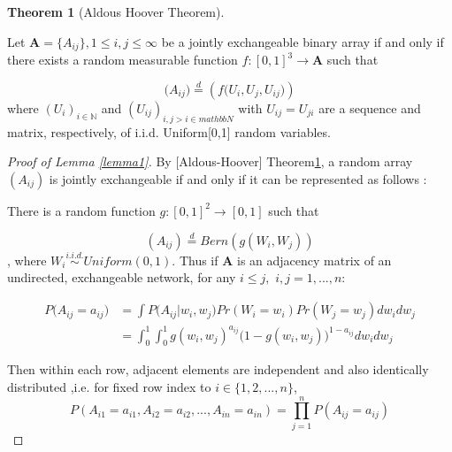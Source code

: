 \documentclass[12pt]{article}
\theoremstyle{definition}
\newtheorem{theorem}{Theorem}[section]
\begin{document}
\begin{theorem}[Aldous Hoover Theorem]
	\label{Aldous_Hoover}

Let $\mathbf{A} = \{A_{ij}\}, 1 \leq i,j \leq \infty$ be a jointly exchangeable binary array if and only if there exists a random measurable function $f : [0,1]^{3} \rightarrow \mathbf{A}$ such that 

\begin{equation}
\big(  A_{ij}  \big) \stackrel{d}{=} \left( f \big( U_{i}, U_{j}, U_{ij} \big)  \right)
\end{equation}
where $(U_{i})_{i \in \mathbb{N}}$ and $(U_{ij})_{i,j > i \in mathbb{N}}$ with $U_{ij} = U_{ji}$ are a sequence and matrix, respectively, of i.i.d. Uniform[0,1] random variables. 
\end{theorem}



\begin{proof}[Proof of Lemma \ref{lemma1}]
By [Aldous-Hoover] Theorem\ref{Aldous_Hoover}, a random array $(A_{ij})$ is jointly exchangeable if and only if it can be represented as follows : 

There is a random function $g : [0,1]^2 \rightarrow [0,1]$ such that 

$$(A_{ij})  \stackrel{d}{=} Bern( g(W_{i}, W_{j}))$$
, where $W_{i} \overset{i.i.d.}{\sim} Uniform(0,1)$. Thus if $\mathbf{A}$ is an adjacency matrix of an undirected, exchangeable network, for any $i \leq j,$ $i,j = 1,... , n$:


\begin{equation}
\begin{split}
P \big(  A_{ij} = a_{ij} \big) & = \int P \big( A_{ij} \big| w_{i}, w_{j} \big) Pr(W_{i} = w_{i}) Pr(W_{j} = w_{j}) dw_{i} dw_{j} \\ & = \int_{0}^{1} \int_{0}^{1} g( w_{i},  w_{j})^{a_{ij}} \big( 1- g( w_{i},  w_{j}) \big)^{1-a_{ij}} dw_{i} dw_{j} 
\end{split}
\end{equation}

Then within each row, adjacent elements are independent and also identically distributed ,i.e. for fixed row index to $i \in \{1,2,... , n\}$,
$$P(A_{i1} = a_{i1}, A_{i2} = a_{i2}, ... , A_{in} = a_{in} ) = \prod\limits_{j=1}^{n} P(A_{ij} = a_{ij})$$

\end{proof}
\end{document}

